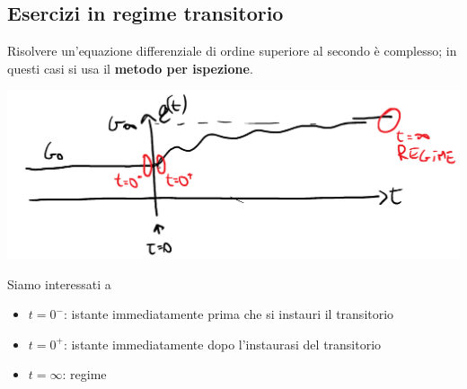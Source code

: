 \documentclass{article}
\begin{document}
\subsection{Esercizi in regime transitorio}
Risolvere un'equazione differenziale di ordine superiore al secondo è complesso; in questi casi si usa il \textbf{metodo per ispezione}.
\begin{center}
    \includegraphics[scale=0.3]{Image/Es_0_Trans.png}
\end{center}
Siamo interessati a 
\begin{itemize}
    \item $t=0^-$: istante immediatamente prima che si instauri il transitorio
    \item $t=0^+$: istante immediatamente dopo l'instaurasi del transitorio
    \item $t=\infty$: regime
\end{itemize}
\end{document}
